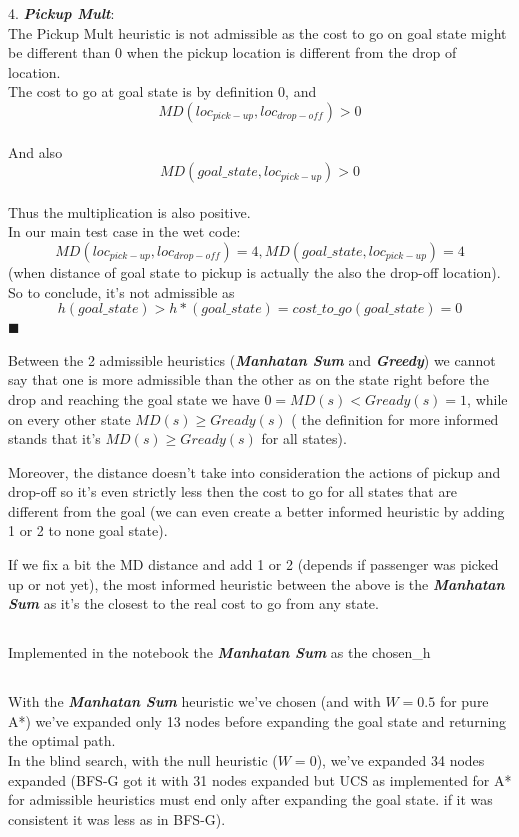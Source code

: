 \documentclass[12pt]{article}
\newcommand{\qed}{\hfill$\blacksquare$}
\begin{document}
4. {\textit{\textbf{Pickup Mult}}}:\\
The Pickup Mult heuristic is not admissible as the cost to go on goal state might be different than 0 when the pickup location is different from the drop of location.\\
The cost to go at goal state is by definition 0, and $$MD(loc_{pick-up},loc_{drop-off}) > 0$$\\
And also
$$MD(goal\_state,loc_{pick-up}) > 0$$\\
Thus the multiplication is also positive.\\
In our main test case in the wet code:
$$MD(loc_{pick-up},loc_{drop-off})=4, MD(goal\_state,loc_{pick-up})=4$$
(when distance of goal state to pickup is actually the also the drop-off location).
So to conclude, it's not admissible as $$h(goal\_state) > h*(goal\_state) = cost\_to\_go(goal\_state) = 0$$
\qed

Between the 2 admissible heuristics ({\textit{\textbf{Manhatan Sum}}} and  {\textit{\textbf{Greedy}}}) we cannot say that one is more admissible than the other as on the state right before the drop and reaching the goal state we have $0 = MD(s) < Gready(s) = 1$, while on every other state $MD(s) \geq Gready(s)$ ( the definition for more informed stands that it's $MD(s) \geq Gready(s)$ for all states).

Moreover, the distance doesn't take into consideration the actions of pickup and drop-off so it's even strictly less then the cost to go for all states that are different from the goal (we can even create a better informed heuristic by adding 1 or 2 to none goal state).

If we fix a bit the MD distance and add 1 or 2 (depends if passenger was picked up or not yet), the most informed heuristic between the above is the {\textit{\textbf{Manhatan Sum}}} as it's the closest to the real cost to go from any state.


\subsection{}

Implemented in the notebook the {\textit{\textbf{Manhatan Sum}}} as the chosen\_h

\subsection{}
With the {\textit{\textbf{Manhatan Sum}}} heuristic we've chosen (and with $W=0.5$ for pure A*) we've expanded only 13 nodes before expanding the goal state and returning the optimal path.\\
In the blind search, with the null heuristic ($W=0$), we've expanded 34 nodes  expanded (BFS-G got it with 31 nodes expanded but UCS as implemented for A* for admissible heuristics must end only after expanding the goal state. if it was consistent it was less as in BFS-G).
\end{document}

